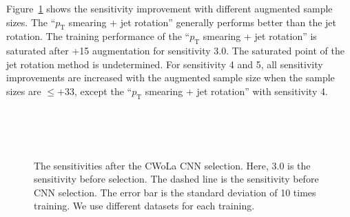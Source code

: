\documentclass[12pt]{article}
\begin{document}
        Figure~\ref{fig:sensitivity_improvement_aug_SB_3_4_5_event_norm} shows the sensitivity improvement with different augmented sample sizes. The ``$p_{\text{T}}$ smearing + jet rotation'' generally performs better than the jet rotation. The training performance of the ``$p_{\text{T}}$ smearing + jet rotation'' is saturated after +15 augmentation for sensitivity 3.0. The saturated point of the jet rotation method is undetermined. For sensitivity 4 and 5, all sensitivity improvements are increased with the augmented sample size when the sample sizes are $\le +33$, except the ``$p_{\text{T}}$ smearing + jet rotation'' with sensitivity 4.
        \begin{figure}[htpb]
            \centering
             \\
             \\
             \\
            \caption{The sensitivities after the CWoLa CNN selection. Here, $3.0$ is the sensitivity before selection. The dashed line is the sensitivity before CNN selection. The error bar is the standard deviation of 10 times training. We use different datasets for each training.}
            \label{fig:sensitivity_improvement_aug_SB_3_4_5_event_norm}
        \end{figure}
\end{document}
